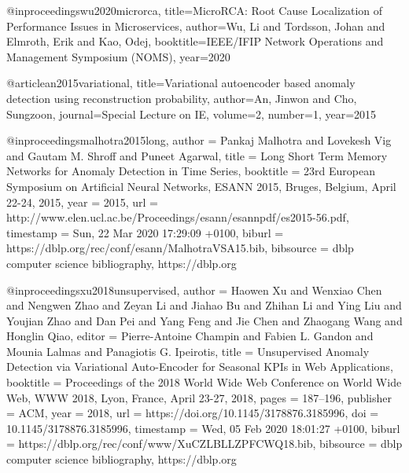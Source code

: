 @inproceedings{wu2020microrca,
  title={MicroRCA: Root Cause Localization of Performance Issues in Microservices},
  author={Wu, Li and Tordsson, Johan and Elmroth, Erik and Kao, Odej},
  booktitle={IEEE/IFIP Network Operations and Management Symposium (NOMS)},
  year={2020}
}

@article{an2015variational,
  title={Variational autoencoder based anomaly detection using reconstruction probability},
  author={An, Jinwon and Cho, Sungzoon},
  journal={Special Lecture on IE},
  volume={2},
  number={1},
  year={2015}
}

@inproceedings{malhotra2015long,
   author    = {Pankaj Malhotra and
               Lovekesh Vig and
               Gautam M. Shroff and
               Puneet Agarwal},
  title     = {Long Short Term Memory Networks for Anomaly Detection in Time Series},
  booktitle = {23rd European Symposium on Artificial Neural Networks, {ESANN} 2015,
               Bruges, Belgium, April 22-24, 2015},
  year      = {2015},
  url       = {http://www.elen.ucl.ac.be/Proceedings/esann/esannpdf/es2015-56.pdf},
  timestamp = {Sun, 22 Mar 2020 17:29:09 +0100},
  biburl    = {https://dblp.org/rec/conf/esann/MalhotraVSA15.bib},
  bibsource = {dblp computer science bibliography, https://dblp.org}
}

@inproceedings{xu2018unsupervised,
  author    = {Haowen Xu and
               Wenxiao Chen and
               Nengwen Zhao and
               Zeyan Li and
               Jiahao Bu and
               Zhihan Li and
               Ying Liu and
               Youjian Zhao and
               Dan Pei and
               Yang Feng and
               Jie Chen and
               Zhaogang Wang and
               Honglin Qiao},
  editor    = {Pierre{-}Antoine Champin and
               Fabien L. Gandon and
               Mounia Lalmas and
               Panagiotis G. Ipeirotis},
  title     = {Unsupervised Anomaly Detection via Variational Auto-Encoder for Seasonal
               KPIs in Web Applications},
  booktitle = {Proceedings of the 2018 World Wide Web Conference on World Wide Web,
               {WWW} 2018, Lyon, France, April 23-27, 2018},
  pages     = {187--196},
  publisher = {{ACM}},
  year      = {2018},
  url       = {https://doi.org/10.1145/3178876.3185996},
  doi       = {10.1145/3178876.3185996},
  timestamp = {Wed, 05 Feb 2020 18:01:27 +0100},
  biburl    = {https://dblp.org/rec/conf/www/XuCZLBLLZPFCWQ18.bib},
  bibsource = {dblp computer science bibliography, https://dblp.org}
}

